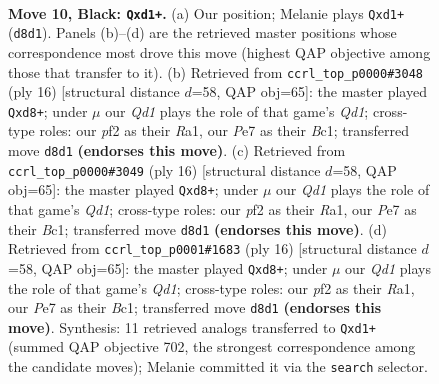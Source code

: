 \documentclass[11pt]{article}
\begin{document}
\clearpage

\begin{figure}[p]\centering
\begin{subfigure}{0.46\textwidth}\centering
\resizebox{\linewidth}{!}{%
\newchessgame
\chessboard[
  setfen={r1bqkb1r/1p2pppp/pnn5/4P3/8/5NP1/PP3P1P/RNBQKB1R b kq - 0 10},
  showmover=false,
  pgfstyle=straightmove, color=movearrow, markmove={d8-d1}
]}
\caption{}
\end{subfigure}\hfill
\begin{subfigure}{0.46\textwidth}\centering
\resizebox{\linewidth}{!}{%
\newchessgame
\chessboard[
  setfen={r1bqk1nr/1pp2ppp/1bn5/p3p3/2P5/P1N2N2/1P2PPPP/R1BQKB1R w KQkq - 0 9},
  showmover=false,
  pgfstyle=straightmove, color=movearrow, markmove={d1-d8}
]}
\caption{}
\end{subfigure}
\\[4pt]
\begin{subfigure}{0.46\textwidth}\centering
\resizebox{\linewidth}{!}{%
\newchessgame
\chessboard[
  setfen={r1bqk1nr/1pp2ppp/1bn5/p3p3/2P5/P1N2N2/1P2PPPP/R1BQKB1R w KQkq - 0 9},
  showmover=false,
  pgfstyle=straightmove, color=movearrow, markmove={d1-d8}
]}
\caption{}
\end{subfigure}\hfill
\begin{subfigure}{0.46\textwidth}\centering
\resizebox{\linewidth}{!}{%
\newchessgame
\chessboard[
  setfen={r1bqk1nr/1pp2ppp/1bn5/p3p3/2P5/P1N2N2/1P2PPPP/R1BQKB1R w KQkq - 0 9},
  showmover=false,
  pgfstyle=straightmove, color=movearrow, markmove={d1-d8}
]}
\caption{}
\end{subfigure}
\caption{\textbf{Move 10, Black: \texttt{Qxd1+}.} (a) Our position; Melanie plays \texttt{Qxd1+} (\texttt{d8d1}). Panels (b)--(d) are the retrieved master positions whose correspondence most drove this move (highest QAP objective among those that transfer to it). (b) Retrieved from \texttt{ccrl\_top\_p0000\#3048} (ply 16) [structural distance $d$=58, QAP obj=65]: the master played \texttt{Qxd8+}; under $\mu$ our \emph{Qd1} plays the role of that game's \emph{Qd1}; cross-type roles: our \emph{p}f2 as their \emph{R}a1, our \emph{P}e7 as their \emph{B}c1; transferred move \texttt{d8d1} \textbf{(endorses this move)}. (c) Retrieved from \texttt{ccrl\_top\_p0000\#3049} (ply 16) [structural distance $d$=58, QAP obj=65]: the master played \texttt{Qxd8+}; under $\mu$ our \emph{Qd1} plays the role of that game's \emph{Qd1}; cross-type roles: our \emph{p}f2 as their \emph{R}a1, our \emph{P}e7 as their \emph{B}c1; transferred move \texttt{d8d1} \textbf{(endorses this move)}. (d) Retrieved from \texttt{ccrl\_top\_p0001\#1683} (ply 16) [structural distance $d$=58, QAP obj=65]: the master played \texttt{Qxd8+}; under $\mu$ our \emph{Qd1} plays the role of that game's \emph{Qd1}; cross-type roles: our \emph{p}f2 as their \emph{R}a1, our \emph{P}e7 as their \emph{B}c1; transferred move \texttt{d8d1} \textbf{(endorses this move)}. Synthesis: 11 retrieved analogs transferred to \texttt{Qxd1+} (summed QAP objective 702, the strongest correspondence among the candidate moves); Melanie committed it via the \texttt{search} selector.}
\label{fig:thought-m19}
\end{figure}
\end{document}
